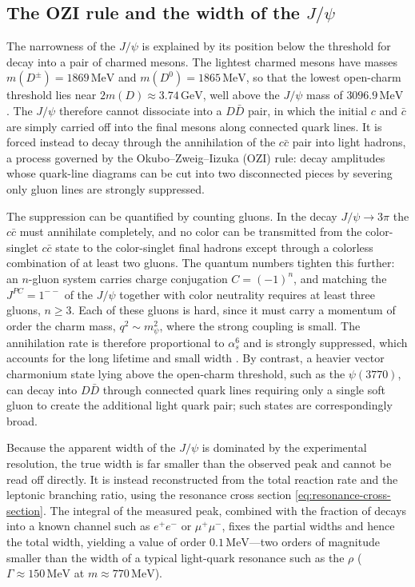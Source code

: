 \FloatBarrier

\subsection{The OZI rule and the width of the \texorpdfstring{$J/\psi$}{J/psi}}
\label{subsec:ozi-width}

The narrowness of the $J/\psi$ is explained by its position below the threshold for decay
into a pair of charmed mesons. The lightest charmed mesons have masses $m(D^\pm) =
1869\,\mathrm{MeV}$ and $m(D^0) = 1865\,\mathrm{MeV}$, so that the lowest open-charm
threshold lies near $2m(D) \approx 3.74\,\mathrm{GeV}$, well above the $J/\psi$ mass of
$3096.9\,\mathrm{MeV}$ \cite[Ch.~8]{Amsler2018}. The $J/\psi$ therefore cannot dissociate
into a $D\bar D$ pair, in which the initial $c$ and $\bar c$ are simply carried off into the
final mesons along connected quark lines. It is forced instead to decay through the
annihilation of the $c\bar c$ pair into light hadrons, a process governed by the
Okubo--Zweig--Iizuka (OZI) rule: decay amplitudes whose quark-line diagrams can be cut into
two disconnected pieces by severing only gluon lines are strongly suppressed.

The suppression can be quantified by counting gluons. In the decay $J/\psi \to 3\pi$ the
$c\bar c$ must annihilate completely, and no color can be transmitted from the color-singlet
$c\bar c$ state to the color-singlet final hadrons except through a colorless combination
of at least two gluons. The quantum numbers tighten this further: an $n$-gluon system carries
charge conjugation $C = (-1)^n$, and matching the $J^{PC} = 1^{--}$ of the $J/\psi$ together
with color neutrality requires at least three gluons, $n \geq 3$. Each of these gluons is
hard, since it must carry a momentum of order the charm mass, $q^2 \sim m_\psi^2$, where the
strong coupling is small. The annihilation rate is therefore proportional to $\alpha_s^6$
and is strongly suppressed, which accounts for the long lifetime and small width
\cite[Ch.~8]{Amsler2018}. By contrast, a heavier vector charmonium state lying above the
open-charm threshold, such as the $\psi(3770)$, can decay into $D\bar D$ through connected
quark lines requiring only a single soft gluon to create the additional light quark pair;
such states are correspondingly broad.

Because the apparent width of the $J/\psi$ is dominated by the experimental resolution, the
true width is far smaller than the observed peak and cannot be read off directly. It is
instead reconstructed from the total reaction rate and the leptonic branching ratio, using
the resonance cross section \eqref{eq:resonance-cross-section}. The integral of the
measured peak, combined with the fraction of decays into a known channel such as
$e^+e^-$ or $\mu^+\mu^-$, fixes the partial widths and hence the total width, yielding a
value of order $0.1\,\mathrm{MeV}$---two orders of magnitude smaller than the width of a
typical light-quark resonance such as the $\rho$ ($\Gamma \approx 150\,\mathrm{MeV}$ at
$m \approx 770\,\mathrm{MeV}$).

